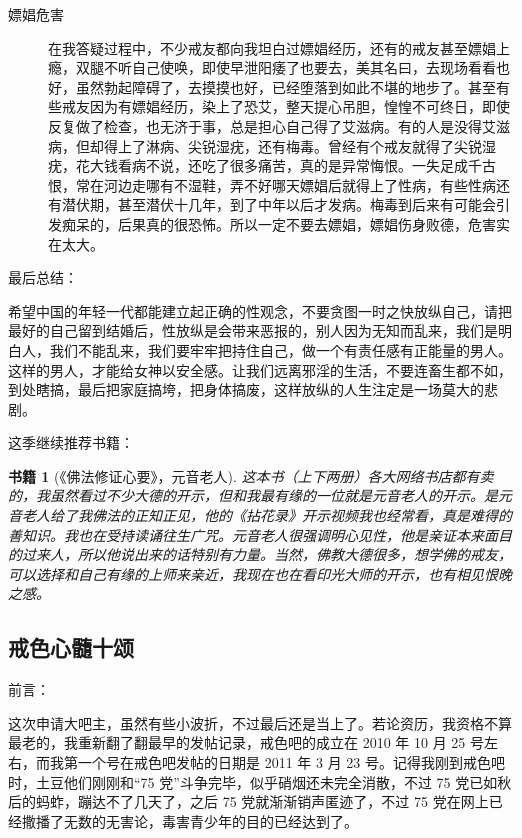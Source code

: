 \documentclass[fontset=founder]{ctexart}
\newtheorem{book}{书籍}
\begin{document}
\begin{description}
    \item[嫖娼危害] 在我答疑过程中，不少戒友都向我坦白过嫖娼经历，还有的戒友甚至嫖娼上瘾，双腿不听自己使唤，即使早泄阳痿了也要去，美其名曰，去现场看看也好，虽然勃起障碍了，去摸摸也好，已经堕落到如此不堪的地步了。甚至有些戒友因为有嫖娼经历，染上了恐艾，整天提心吊胆，惶惶不可终日，即使反复做了检查，也无济于事，总是担心自己得了艾滋病。有的人是没得艾滋病，但却得上了淋病、尖锐湿疣，还有梅毒。曾经有个戒友就得了尖锐湿疣，花大钱看病不说，还吃了很多痛苦，真的是异常悔恨。一失足成千古恨，常在河边走哪有不湿鞋，弄不好哪天嫖娼后就得上了性病，有些性病还有潜伏期，甚至潜伏十几年，到了中年以后才发病。梅毒到后来有可能会引发痴呆的，后果真的很恐怖。所以一定不要去嫖娼，嫖娼伤身败德，危害实在太大。
\end{description}

最后总结：

希望中国的年轻一代都能建立起正确的性观念，不要贪图一时之快放纵自己，请把最好的自己留到结婚后，性放纵是会带来恶报的，别人因为无知而乱来，我们是明白人，我们不能乱来，我们要牢牢把持住自己，做一个有责任感有正能量的男人。这样的男人，才能给女神以安全感。让我们远离邪淫的生活，不要连畜生都不如，到处瞎搞，最后把家庭搞垮，把身体搞废，这样放纵的人生注定是一场莫大的悲剧。

这季继续推荐书籍：

\begin{book}[《佛法修证心要》，元音老人]
    这本书（上下两册）各大网络书店都有卖的，我虽然看过不少大德的开示，但和我最有缘的一位就是元音老人的开示。是元音老人给了我佛法的正知正见，他的《拈花录》开示视频我也经常看，真是难得的善知识。我也在受持读诵往生广咒。元音老人很强调明心见性，他是亲证本来面目的过来人，所以他说出来的话特别有力量。当然，佛教大德很多，想学佛的戒友，可以选择和自己有缘的上师来亲近，我现在也在看印光大师的开示，也有相见恨晚之感。
\end{book}

\subsection{戒色心髓十颂}

前言：

这次申请大吧主，虽然有些小波折，不过最后还是当上了。若论资历，我资格不算最老的，我重新翻了翻最早的发帖记录，戒色吧的成立在 2010 年 10 月 25 号左右，而我第一个号在戒色吧发帖的日期是 2011 年 3 月 23 号。记得我刚到戒色吧时，土豆他们刚刚和“75 党”斗争完毕，似乎硝烟还未完全消散，不过 75 党已如秋后的蚂蚱，蹦达不了几天了，之后 75 党就渐渐销声匿迹了，不过 75 党在网上已经撒播了无数的无害论，毒害青少年的目的已经达到了。
\end{document}
